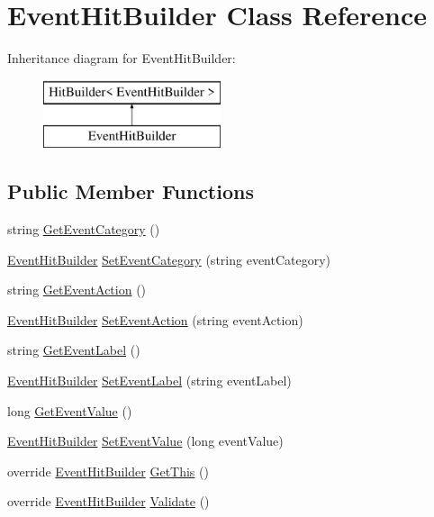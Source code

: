 \hypertarget{class_event_hit_builder}{}\section{Event\+Hit\+Builder Class Reference}
\label{class_event_hit_builder}
Inheritance diagram for Event\+Hit\+Builder\+:\begin{figure}[H]
\begin{center}
\leavevmode
\includegraphics[height=2.000000cm]{class_event_hit_builder}
\end{center}
\end{figure}
\subsection*{Public Member Functions}
\begin{DoxyCompactItemize}
\item 
string \hyperlink{class_event_hit_builder_a65aa7ee23740ebefe7c49881ab53bad9}{Get\+Event\+Category} ()
\item 
\hyperlink{class_event_hit_builder}{Event\+Hit\+Builder} \hyperlink{class_event_hit_builder_aa5d8133556117fff3fd1bb6606285053}{Set\+Event\+Category} (string event\+Category)
\item 
string \hyperlink{class_event_hit_builder_a01d1b51c2275b19d38248e0dda620c51}{Get\+Event\+Action} ()
\item 
\hyperlink{class_event_hit_builder}{Event\+Hit\+Builder} \hyperlink{class_event_hit_builder_a0a693931c5d080312b87094a1d8f852a}{Set\+Event\+Action} (string event\+Action)
\item 
string \hyperlink{class_event_hit_builder_a7accb5ed1f967957ca9ef504f697b3f6}{Get\+Event\+Label} ()
\item 
\hyperlink{class_event_hit_builder}{Event\+Hit\+Builder} \hyperlink{class_event_hit_builder_aaada6635530cfce3a16df4cad5cfe5b9}{Set\+Event\+Label} (string event\+Label)
\item 
long \hyperlink{class_event_hit_builder_a1ac04b1d7ab4ca075b21cb65a8be7660}{Get\+Event\+Value} ()
\item 
\hyperlink{class_event_hit_builder}{Event\+Hit\+Builder} \hyperlink{class_event_hit_builder_a7ab3aa0b49584d6ad3011107c8958f30}{Set\+Event\+Value} (long event\+Value)
\item 
override \hyperlink{class_event_hit_builder}{Event\+Hit\+Builder} \hyperlink{class_event_hit_builder_a0eade8be0a38bfbdaa0f2d0c3dec59ee}{Get\+This} ()
\item 
override \hyperlink{class_event_hit_builder}{Event\+Hit\+Builder} \hyperlink{class_event_hit_builder_ac25f1311eb1e5ab9910494fd143a6f8f}{Validate} ()
\end{DoxyCompactItemize}


